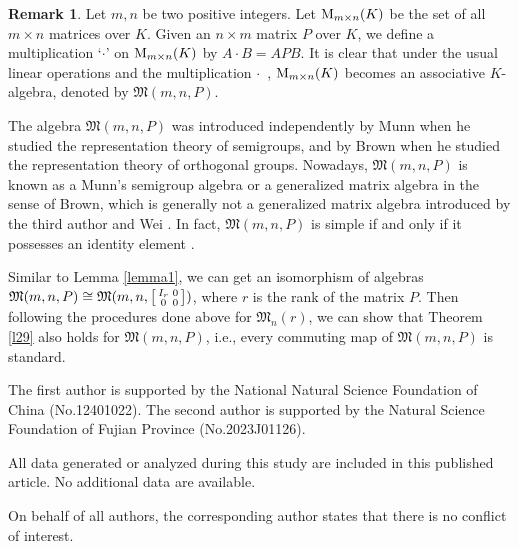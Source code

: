 \documentclass[reqno]{amsart}
\theoremstyle{plain}
\theoremstyle{definition}
\newtheorem{remark}[theorem]{Remark}
\begin{document}
\begin{remark}
Let $m,n$ be two positive integers. Let ${\rm M}_{m\times n}(K)$ be the set of all $m\times n$ matrices over $K$.
Given an $n\times m$ matrix $P$ over $K$, we define a multiplication ‘$\cdot$’ on ${\rm M}_{m\times n}(K)$ by
$A \cdot B=A P B$. It is clear that under the usual linear operations and the multiplication $\cdot$\, ,
${\rm M}_{m\times n}(K)$ becomes an associative $K$-algebra,
denoted by $\mathfrak{M}(m, n, P)$.

The algebra $\mathfrak{M}(m, n, P)$ was introduced independently by Munn \cite{Munn} when he studied the representation theory of semigroups, and by Brown \cite{Brown} when he studied the
representation theory of orthogonal groups.
Nowadays, $\mathfrak{M}(m, n, P)$ is known as a Munn's semigroup algebra or a generalized matrix algebra in the
sense of Brown, which is generally not 
a generalized matrix algebra
introduced by the third author and Wei \cite{XiaoWei}.
In fact, $\mathfrak{M}(m, n, P)$ is simple if and only if
it possesses an identity element \cite[Theorem]{Brown}.

Similar to Lemma \ref{lemma1}, we can get an isomorphism
of algebras
$\mathfrak{M}(m, n, P)\cong \mathfrak{M}(m, n, \left[\smallmatrix I_{r} & 0 \\ 0 & 0 \endsmallmatrix \right])$, where $r$ is the rank of the matrix $P$.
Then following the procedures done above for $\mathfrak{M}_n(r)$, we can show that
Theorem \ref{l29} also holds for $\mathfrak{M}(m, n, P)$,
i.e., every commuting map of $\mathfrak{M}(m, n, P)$
is standard.
\end{remark}
\smallskip
{} 
The first author is supported by the National Natural Science Foundation of China (No.12401022).
The second author is
supported by the Natural Science Foundation of Fujian Province (No.2023J01126).

\smallskip
{} All data generated or analyzed during this study are included in this published article. No additional data are available.

\smallskip
{} On behalf of all authors, the corresponding author states that there is no conflict of
interest.

\end{document}
